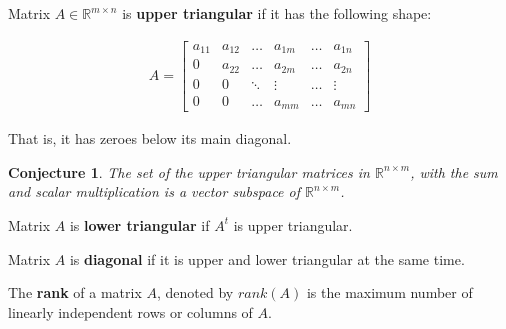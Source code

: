 \documentclass[aspectratio=169]{beamer}
\newtheorem{proposition}{Conjecture}[section]
\begin{document}
\begin{frame}
    \begin{definition}
        Matrix $A\in\mathds{R}^{m\times n}$ is \textbf{upper triangular} if it has the following shape:
        
        \begin{align*}
            A=\left[
            \begin{array}{cccccc}
                a_{11} & a_{12} & \ldots & a_{1m} & \ldots & a_{1n}\\
                0 & a_{22} & \ldots & a_{2m} & \ldots & a_{2n}\\
                0 & 0 & \ddots & \vdots & \ldots& \vdots\\
                0 & 0 & \ldots & a_{mm} & \ldots & a_{mn}
            \end{array}
            \right]
        \end{align*}
        
        That is, it has zeroes below its main diagonal.
    \end{definition}
    
    \begin{proposition}
        The set of the upper triangular matrices in $\mathds{R}^{n\times m}$, with the sum and scalar multiplication is a vector subspace of $\mathds{R}^{n\times m}$.
    \end{proposition}
\end{frame}

\begin{frame}
    \begin{definition}
        Matrix $A$ is \textbf{lower triangular} if $A^t$ is upper triangular.
    \end{definition}

    \begin{definition}
        Matrix $A$ is \textbf{diagonal} if it is upper and lower triangular at the same time.
    \end{definition}

    \begin{definition}
        The \textbf{rank} of a matrix $A$, denoted by $rank(A)$ is the maximum number of linearly independent rows or columns of $A$.
    \end{definition}
\end{frame}
\end{document}
